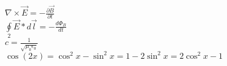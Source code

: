\documentclass{article}
\begin{document}
\(\nabla\times\vec{E}=-\frac{\partial\vec{B}}{\partial t}\)\\
\(\oint\limits_2\vec{E}*d\vec{l}=-\frac{d \Phi_B}{dt}\)\\
\(c=\frac{1}{\sqrt{\mu_0\epsilon_0}}\)\\
\(\cos(2x)=\cos^2x-\sin^2x=1-2\sin^2x=2\cos^2x-1\)
\end{document}
